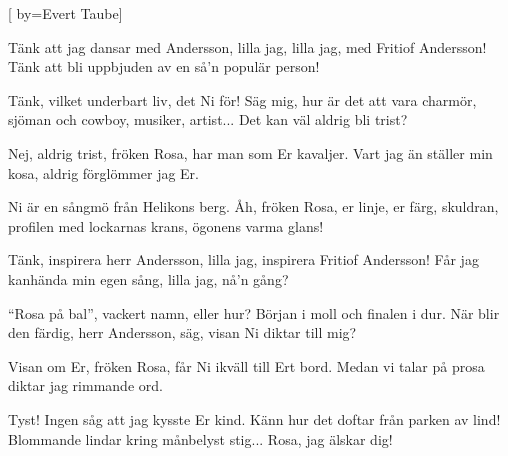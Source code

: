 


[ 	%
	by={Evert Taube}]		%
	
\beginverse*		%
Tänk att jag dansar med Andersson,
lilla jag, lilla jag,
med Fritiof Andersson!
Tänk att bli uppbjuden av en så'n
populär person!
\endverse			%

\beginverse*		%
Tänk, vilket underbart liv, det Ni för!
Säg mig, hur är det att vara charmör,
sjöman och cowboy, musiker, artist...
Det kan väl aldrig bli trist?
\endverse			%

\beginverse*		%
Nej, aldrig trist, fröken Rosa,
har man som Er kavaljer.
Vart jag än ställer min kosa,
aldrig förglömmer jag Er.
\endverse			%

\beginverse*		%
Ni är en sångmö från Helikons berg.
Åh, fröken Rosa, er linje, er färg,
skuldran, profilen med lockarnas krans,
ögonens varma glans!
\endverse			%

\beginverse*		%
Tänk, inspirera herr Andersson,
lilla jag, inspirera Fritiof Andersson!
Får jag kanhända min egen sång,
lilla jag, nå'n gång?
\endverse			%

\beginverse*		%
``Rosa på bal'', vackert namn, eller hur?
Början i moll och finalen i dur.
När blir den färdig, herr Andersson, säg,
visan Ni diktar till mig?
\endverse			%

\beginverse*		%
Visan om Er, fröken Rosa,
får Ni ikväll till Ert bord.
Medan vi talar på prosa
diktar jag rimmande ord.
\endverse			%

\beginverse*		%
Tyst! Ingen såg att jag kysste Er kind.
Känn hur det doftar från parken av lind!
Blommande lindar kring månbelyst stig...
Rosa, jag älskar dig!
\endverse			%
\endsong			%
